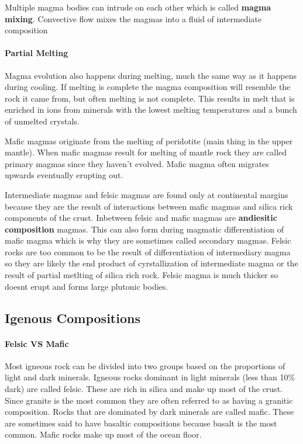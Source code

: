 \documentclass{article}
\begin{document}
Multiple magma bodies can intrude on each other which is called \textbf{magma mixing}. Convective flow mixes the magmas into a fluid of intermediate composition


\paragraph{Partial Melting} %
\label{par:partial_melting}
Magma evolution also happens during melting, much the same way as it happens during cooling. If melting is complete the magma composition will resemble the rock it came from, but often melting is not complete. This results in melt that is enriched in ions from minerals with the lowest melting temperatures and a bunch of unmelted crystals.

Mafic magmas originate from the melting of peridotite (main thing in the upper mantle). When mafic magmas result for melting of mantle rock they are called primary magmas since they haven't evolved. Mafic magma often migrates upwards eventually erupting out.

Intermediate magmas  and felsic magmas are found only at continental margins because they are the result of interactions between mafic magmas and silica rick components of the crust. Inbetween felsic and mafic magmas are \textbf{andiesitic composition} magmas. This can also form during magmatic differentiation of mafic magma which is why they are sometimes called secondary magmas. Felsic rocks are too common to be the result of differentiation of intermediary magma so they are likely the end product of cyrstallization of intermediate magma or the result of partial metlting of silica rich rock. Felsic magma is much thicker so doesnt erupt and forms large plutonic bodies.



\subsection*{Igenous Compositions} %
\label{sub:igenous_compositions}
\paragraph{Felsic VS Mafic} %
\label{par:felsic_vs_mafic}
Most igneous rock can be divided into two groups based on the proportions of light and dark minerals. Igneous rocks dominant in light minerals (less than 10\% dark) are called felsic. These are rich in silica and make up most of the crust. Since granite is the most common they are often referred to as having a granitic composition. Rocks that are dominated by dark minerals are called mafic. These are sometimes said to have basaltic compositions because basalt is the most common. Mafic rocks make up most of the ocean floor.
\end{document}
